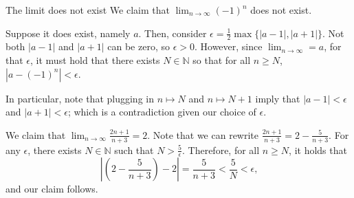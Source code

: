 \begin{exmp}{The limit does not exist}{}
	We claim that \(\lim_{n\to\infty} (-1)^n\) does not exist.  

	Suppose it does exist, namely \(a\). Then, consider \(\epsilon = \frac{1}{2} \max\{|a - 1|, |a + 1|\}\). Not both \(|a - 1|\) and  \(|a + 1|\) can be zero, so  \(\epsilon > 0\). However, since \(\lim_{n\to\infty} = a\), for that \(\epsilon\), it must hold that there exists \(N \in \mathbb{N}\) so that for all \(n \geq N\), \(|a - (-1)^n| < \epsilon\).

	In particular, note that plugging in \(n \mapsto N\) and \(n\mapsto N+1\) imply that \(|a - 1| < \epsilon\) and \(|a + 1| < \epsilon\); which is a contradiction given our choice of \(\epsilon\).
\end{exmp}

\begin{exmp}{}{}
	We claim that \(\lim_{n\to\infty} \frac{2n+1}{n+3} = 2\). 
	Note that we can rewrite \(\frac{2n+1}{n+3} = 2 - \frac{5}{n+3}\). For any \(\epsilon\), there exists \(N \in \mathbb{N}\) such that \(N > \frac{5}{\epsilon}\). Therefore, for all \(n \geq N\), it holds that \[
		\left|\left(2 - \frac{5}{n+3}\right) - 2\right| = \frac{5}{n+3} < \frac{5}{N} < \epsilon\text{,}
	\]
	and our claim follows.
\end{exmp}
